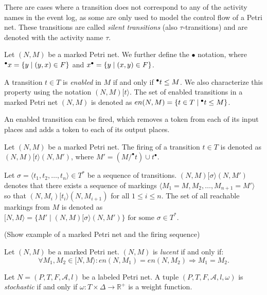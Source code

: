 There are cases where a transition does not correspond to any of the activity names in the event log, as some are only used to model the control flow of a Petri net. These transitions are called \emph{silent transitions} (also $\tau$-transitions) and are denoted with the activity name $\tau$.

\begin{definition}
    Let $(N, M)$ be a marked Petri net.  We further define the $\bullet$ notation, where ${^{\bullet}x} = \{ y \mid (y, x) \in F \}$ and $x^{\bullet}= \{ y \mid (x, y) \in F \}$.
    
    A transition $t \in T$ is \emph{enabled} in $M$ if and only if ${^{\bullet}t} \leq M$. We also characterize this property using the notation $(N, M)[t\rangle$. The set of enabled transitions in a marked Petri net $(N, M)$ is denoted as $en(N, M) = \{ t \in T \mid {^{\bullet}t} \leq M \}$.
\end{definition}

An enabled transition can be fired, which removes a token from each of its input places and adds a token to each of its output places.

\begin{definition}
    Let $(N, M)$ be a marked Petri net. The firing of a transition $t \in T$ is denoted as $(N, M) [t\rangle (N, M')$, where $M' = (M / ^{\bullet}t) \cup t^{\bullet}$.

    Let $\sigma = \langle t_1, t_2, \dots, t_n \rangle \in T^*$ be a sequence of transitions. $(N, M)[\sigma \rangle (N, M')$ denotes that there exists a sequence of markings $\langle M_1 = M, M_2, \dots, M_{n+1} = M' \rangle$ so that $(N, M_i)[t_i \rangle (N, M_{i+1})$ for all $1 \leq i \leq n$. The set of all reachable markings from $M$ is denoted as $[N, M\rangle = \{ M' \mid (N, M) [\sigma\rangle (N, M') \} \text{ for some } \sigma \in T^*$.
\end{definition}

(Show example of a marked Petri net and the firing sequence)

\begin{definition}[Lucency]
    Let $(N, M)$ be a marked Petri net. $(N, M)$ is \emph{lucent} if and only if:
    \[
        \forall M_1, M_2 \in [N, M \rangle: en(N, M_1) = en(N, M_2) \Rightarrow M_1 = M_2.
    \]
\end{definition}



\begin{definition}
    Let $N = (P, T, F, \mathcal{A}, l)$ be a labeled Petri net. A tuple $(P, T, F, \mathcal{A}, l, \omega)$ is \emph{stochastic} if and only if $\omega: T \times \Delta \to \mathbb{R}^+$ is a weight function.
\end{definition}

